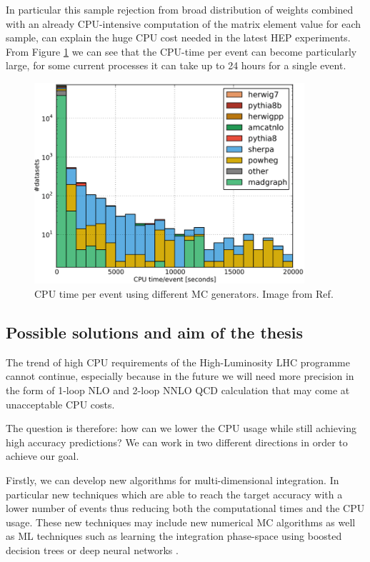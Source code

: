 \documentclass[../main/main.tex]{subfiles}
\begin{document}
In particular this sample rejection from broad distribution of weights combined with an already CPU-intensive computation of the matrix element value for each sample,  can explain the huge CPU cost needed in the latest HEP experiments.  From Figure \ref{CPU-time} we can see that the CPU-time per event can become particularly large,  for some current processes it can take up to 24 hours for a single event.


\begin{figure}[]
	\centering
	\includegraphics[width = 10cm]{../images/CPU-time.png}
	\caption{CPU time per event using different MC generators. Image from Ref\cite{Buckley:2019wov}.}
	\label{CPU-time}
\end{figure}


\subsection{Possible solutions and aim of the thesis}

The trend of high CPU requirements of the High-Luminosity LHC programme cannot continue, especially because in the future we will need
more precision in the form of 1-loop NLO and 2-loop NNLO QCD calculation that may come at unacceptable CPU costs.

The question is therefore: how can we lower the CPU usage while still achieving high accuracy predictions?
We can work in two different directions in order to achieve our goal.

Firstly, we can develop new algorithms for multi-dimensional integration. In particular new techniques which are able to reach the target accuracy
with a lower number of events thus reducing both the computational times and the CPU usage. These new techniques may include new numerical
MC algorithms as well as ML techniques such as  learning the integration phase-space using boosted decision trees \cite{Bendavid:2017zhk} or deep neural networks \cite{unknown}. 
\end{document}
